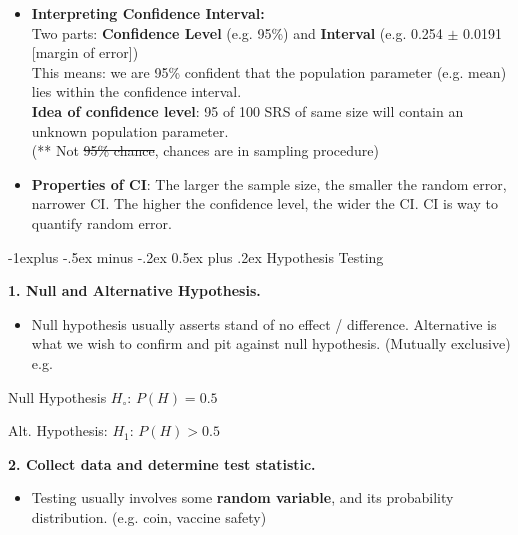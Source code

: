 \documentclass[10pt, landscape]{article}
\makeatletter
\renewcommand{\subsection}{\@startsection{subsection}{2}{0mm}%
                                {-1explus -.5ex minus -.2ex}%
                                {0.5ex plus .2ex}%
                                {\normalfont\normalsize\bfseries}}
\makeatother
\begin{document}
\begin{multicols*}{4}
\begin{itemize}
	\item \textbf{Interpreting Confidence Interval: } \\ Two parts: \textbf{Confidence Level} (e.g. 95\%) and \textbf{	Interval} (e.g. 0.254 $\pm$ 0.0191 [margin of error]) \\
	This means: we are 95\% confident that the population parameter (e.g. mean) lies within the confidence interval. \\
	\textbf{Idea of confidence level}: 95 of 100 SRS of same size will contain an unknown population parameter.\\
        (** Not \sout{95\% chance}, chances are in sampling procedure)
	\item \textbf{Properties of CI}: The larger the sample size, the smaller the random error, narrower CI. The higher the confidence level, the wider the CI. CI is way to quantify random error.

\end{itemize}

\subsection{Hypothesis Testing}

	{\small \textbf{1. Null and Alternative Hypothesis.} \\}
\begin{itemize}
	\item Null hypothesis usually asserts stand of no effect / difference. Alternative is what we wish to confirm and pit against null hypothesis. (Mutually exclusive) e.g.
\end{itemize}
	\centerline{Null Hypothesis $H_\circ$: $P(H) = 0.5$}
	\centerline{Alt. Hypothesis: $H_1$: $P(H) > 0.5 $}

	{\small \textbf{2. Collect data and determine test statistic.} \\ } 
\begin{itemize} 
	\item Testing usually involves some \textbf{random variable}, and its probability distribution. (e.g. coin, vaccine safety)
\end{itemize}


\end{multicols*}
\end{document}
